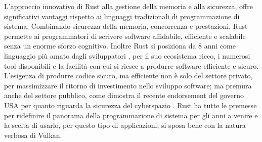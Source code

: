 L'approccio innovativo di Rust alla gestione della memoria e alla sicurezza, offre significativi vantaggi rispetto ai linguaggi tradizionali di programmazione di sistema. Combinando sicurezza della memoria, concorrenza e prestazioni, Rust permette ai programmatori di scrivere software affidabile, efficiente e scalabile senza un enorme sforzo cognitivo. Inoltre Rust si posiziona da 8 anni come linguaggio più amato dagli sviluppatori \cite[]{Rust:love}, per il suo ecosistema ricco, i numerosi tool disponibili e la facilità con cui si riesce a produrre software efficiente e sicuro. L'esigenza di produrre codice sicuro, ma efficiente non è solo del settore privato, per massimizzare il ritorno di investimento nello sviluppo software; ma premura anche del settore pubblico, come dimostra il recente endorsement del governo USA per quanto riguarda la sicurezza del cyberspazio \cite[]{Gov:rust_use}. Rust ha tutte le premesse per ridefinire il panorama della programmazione di sistema per gli anni a venire e la scelta di usarlo, per questo tipo di applicazioni, si sposa bene con la natura verbosa di Vulkan. 